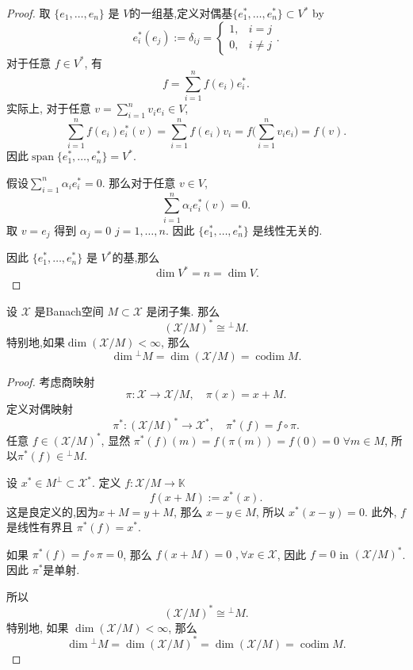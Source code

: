 \documentclass[lang=cn,newtx,10pt,scheme=chinese,thmcnt=chapter]{elegantbook}
\begin{document}
\begin{proof}
取 $\{ e_1, \dots, e_n \}$ 是 $V$的一组基,定义对偶基$\{ e_1^*, \dots, e_n^* \} \subset V^*$ by
\[
e_i^*(e_j) := \delta_{ij} = 
\begin{cases} 
1, & i=j \\ 
0, & i \neq j 
\end{cases}.
\]
 对于任意 $f \in V^*$, 有
\[
f = \sum_{i=1}^n f(e_i) e_i^*.
\]
实际上, 对于任意 $v = \sum_{i=1}^n v_i e_i \in V$,
\[
\sum_{i=1}^n f(e_i) e_i^*(v) = \sum_{i=1}^n f(e_i) v_i = f\Big(\sum_{i=1}^n v_i e_i\Big) = f(v).
\]
因此$\operatorname{span}\{ e_1^*, \dots, e_n^* \}=V^*$.

假设$\sum_{i=1}^n \alpha_i e_i^* = 0$. 那么对于任意 $v \in V$,
\[
\sum_{i=1}^n \alpha_i e_i^*(v) = 0.
\]
取 $v = e_j$ 得到 $\alpha_j = 0$  $j=1,\dots,n$. 因此 $\{ e_1^*, \dots, e_n^* \}$ 是线性无关的.

因此 $\{ e_1^*, \dots, e_n^* \}$ 是 $V^*$的基,那么
\[
\dim V^* = n = \dim V.
\]
\end{proof}

\begin{theorem}
设 $\mathcal{X}$ 是Banach空间 $M \subset \mathcal{X}$ 是闭子集. 那么
\[
(\mathcal{X} / M)^* \cong {}^\perp M.
\]
特别地,如果$\dim(\mathcal{X}/M) < \infty$, 那么
\[
\dim {}^\perp M = \dim(\mathcal{X}/M) = \operatorname{codim} M.
\]
\end{theorem}

\begin{proof}
考虑商映射
\[
\pi: \mathcal{X} \to \mathcal{X}/M, \quad \pi(x) = x + M.
\]
定义对偶映射
\[
\pi^* : (\mathcal{X}/M)^* \to \mathcal{X}^*, \quad \pi^*(f) = f \circ \pi.
\]
任意 $f \in (\mathcal{X}/M)^*$, 显然 $\pi^*(f)(m) = f(\pi(m)) = f(0) = 0$ $\forall m \in M$, 所以$\pi^*(f) \in{}^\perp M$.

设 $x^* \in M^\perp \subset \mathcal{X}^*$. 定义 $f : \mathcal{X}/M \to \mathbb{K}$ 
\[
f(x+M) := x^*(x).
\]
这是良定义的,因为$x+M = y+M$, 那么 $x-y \in M$, 所以 $x^*(x-y) = 0$. 此外, $f$ 是线性有界且 $\pi^*(f) = x^*$.

如果 $\pi^*(f) = f \circ \pi = 0$, 那么 $f(x+M) = 0$ $,\forall x \in \mathcal{\mathcal{X}}$, 因此 $f = 0$ in $(\mathcal{X}/M)^*$. 因此 $\pi^*$是单射.

所以
\[
(\mathcal{X}/M)^* \cong {}^\perp M.
\]
特别地, 如果 $\dim(\mathcal{X}/M) < \infty$, 那么
\[
\dim{}^\perp M =\dim (\mathcal{X}/M)^*= \dim(\mathcal{X}/M) = \operatorname{codim} M.
\]

\end{proof}
\end{document}
